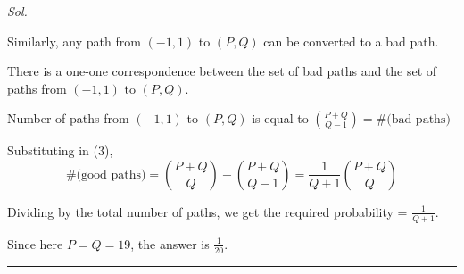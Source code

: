 \documentclass[DIV=15, fleqn, oneside, 8pt]{scrartcl}
\theoremstyle{clean}
\newenvironment{solution}
{\par\textit{Sol.} }     %
{\par\medskip\hrule\bigskip}
\begin{document}
\begin{solution}
\begin{center}
\end{center}

Similarly, any path from $(-1, 1)$ to $(P, Q)$ can be converted to a bad path.

There is a one-one correspondence between the set of bad paths and the set of paths from
$(-1, 1)$ to $(P, Q)$.

Number of paths from $(-1, 1)$ to $(P, Q)$ is equal to ${P + Q \choose Q - 1} = \text{\#(bad paths)}$

Substituting in (3),
\[
\text{\#(good paths)} = {P+Q \choose Q} - {P+Q \choose Q-1} = \frac{1}{Q+1} {P+Q \choose Q}
\]

Dividing by the total number of paths, we get the required probability = $\frac{1}{Q+1}$.

Since here $P=Q=19$, the answer is $\frac{1}{20}$.
\end{solution}

\newpage
\end{document}
